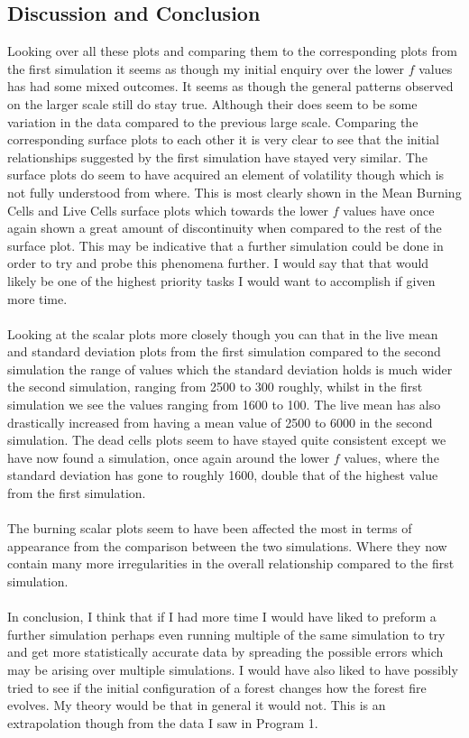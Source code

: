 \documentclass{article}
\begin{document}
\subsection{Discussion and Conclusion}
Looking over all these plots and comparing them to the corresponding plots from the first simulation it seems as though my initial enquiry over the lower $f$ values has had some mixed outcomes. It seems as though the general patterns observed on the larger scale still do stay true. Although their does seem to be some variation in the data compared to the previous large scale. Comparing the corresponding surface plots to each other it is very clear to see that the initial relationships suggested by the first simulation have stayed very similar. The surface plots do seem to have acquired an element of volatility though which is not fully understood from where. This is most clearly shown in the Mean Burning Cells and Live Cells surface plots which towards the lower $f$ values have once again shown a great amount of discontinuity when compared to the rest of the surface plot. This may be indicative that a further simulation could be done in order to try and probe this phenomena further. I would say that that would likely be one of the highest priority tasks I would want to accomplish if given more time.\\
\\
Looking at the scalar plots more closely though you can that in the live mean and standard deviation plots from the first simulation compared to the second simulation the range of values which the standard deviation holds is much wider the second simulation, ranging from 2500 to 300 roughly, whilst in the first simulation we see the values ranging from 1600 to 100. The live mean has also drastically increased from having a mean value of 2500 to 6000 in the second simulation. The dead cells plots seem to have stayed quite consistent except we have now found a simulation, once again around the lower $f$ values, where the standard deviation has gone to roughly 1600, double that of the highest value from the first simulation.\\
\\
The burning scalar plots seem to have been affected the most in terms of appearance from the comparison between the two simulations. Where they now contain many more irregularities in the overall relationship compared to the first simulation.\\
\\
In conclusion, I think that if I had more time I would have liked to preform a further simulation perhaps even running multiple of the same simulation to try and get more statistically accurate data by spreading the possible errors which may be arising over multiple simulations. I would have also liked to have possibly tried to see if the initial configuration of a forest changes how the forest fire evolves. My theory would be that in general it would not. This is an extrapolation though from the data I saw in Program 1. 


\end{document}
